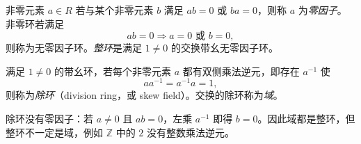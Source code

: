 \documentclass[lang=cn,a4paper,fontset=none,zihao=false,10pt,openany,twoside]{beautybook}
\numberwithin{algorithm}{chapter}
\begin{document}
\begin{definition}
非零元素 $a\in R$ 若与某个非零元素 $b$ 满足 $ab=0$ 或 $ba=0$，则称 $a$ 为\emph{零因子}。非零环若满足
\[
 ab=0\Longrightarrow a=0\text{ 或 }b=0,
\]
则称为无零因子环。\emph{整环}是满足 $1\ne0$ 的交换带幺无零因子环。

满足 $1\ne0$ 的带幺环，若每个非零元素 $a$ 都有双侧乘法逆元，即存在 $a^{-1}$ 使
\[
 aa^{-1}=a^{-1}a=1,
\]
则称为\emph{除环}（division ring，或 skew field）。交换的除环称为\emph{域}。
\end{definition}
除环没有零因子：若 $a\ne0$ 且 $ab=0$，左乘 $a^{-1}$ 即得 $b=0$。因此域都是整环，但整环不一定是域，例如 $\mathbb Z$ 中的 $2$ 没有整数乘法逆元。
\end{document}
